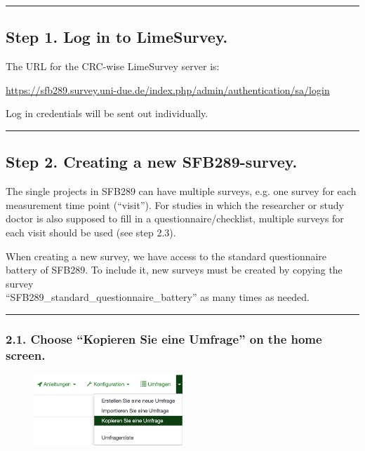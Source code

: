 \par\noindent\rule{\textwidth\color{pniblue}}{0.4pt}
\subsection*{Step 1. Log in to LimeSurvey.}
The URL for the CRC-wise LimeSurvey server is:

\hyperref[https://sfb289.survey.uni-due.de/index.php/admin/authentication/sa/login]{https://sfb289.survey.uni-due.de/index.php/admin/authentication/sa/login}

Log in credentials will be sent out individually. 
\small\setlength\fboxsep{5pt}\setlength\fboxrule{1pt}

\par\noindent\rule{\textwidth\color{pniblue}}{0.4pt}
\subsection*{ Step 2. Creating a new SFB289-survey.}
The single projects in SFB289 can have multiple surveys, e.g. one survey for each measurement time point (“visit”). For studies in which the researcher or study doctor is also supposed to fill in a questionnaire/checklist, multiple surveys for each visit should be used (see step 2.3).

When creating a new survey, we have access to the standard questionnaire battery of SFB289. To include it, new surveys must be created by copying the survey \\ “SFB289\_standard\_questionnaire\_battery” as many times as needed. 

\par\noindent\rule{\textwidth\color{pniblue}}{0.4pt}
\subsubsection*{2.1. Choose “Kopieren Sie eine Umfrage” on the home screen.}
\begin{figure}[H]
\includegraphics[width=0.5\textwidth]{docs/fig/ls_sop2.1.png}
\end{figure}

